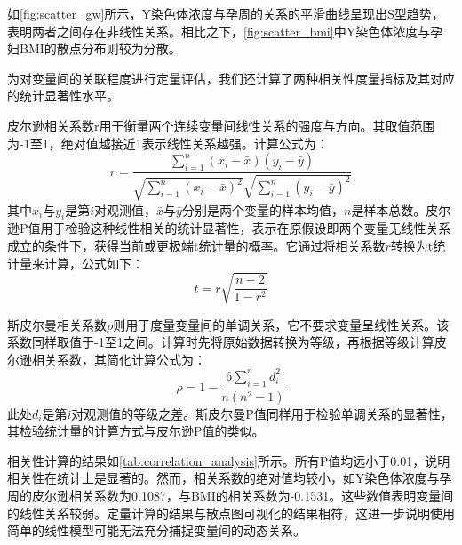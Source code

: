 如\cref{fig:scatter_gw}所示，Y染色体浓度与孕周的关系的平滑曲线呈现出S型趋势，表明两者之间存在非线性关系。相比之下，\cref{fig:scatter_bmi}中Y染色体浓度与孕妇BMI的散点分布则较为分散。

为对变量间的关联程度进行定量评估，我们还计算了两种相关性度量指标及其对应的统计显著性水平。

皮尔逊相关系数r用于衡量两个连续变量间线性关系的强度与方向。其取值范围为-1至1，绝对值越接近1表示线性关系越强。计算公式为：
\begin{equation}
r = \frac{\sum_{i=1}^{n}(x_i - \bar{x})(y_i - \bar{y})}{\sqrt{\sum_{i=1}^{n}(x_i - \bar{x})^2} \sqrt{\sum_{i=1}^{n}(y_i - \bar{y})^2}}
\end{equation}
其中$x_i$与$y_i$是第$i$对观测值，$\bar{x}$与$\bar{y}$分别是两个变量的样本均值，$n$是样本总数。皮尔逊P值用于检验这种线性相关的统计显著性，表示在原假设即两个变量无线性关系成立的条件下，获得当前或更极端t统计量的概率。它通过将相关系数$r$转换为t统计量来计算，公式如下：
\begin{equation}
t = r \sqrt{\frac{n-2}{1-r^2}}
\end{equation}


斯皮尔曼相关系数$\rho$则用于度量变量间的单调关系，它不要求变量呈线性关系。该系数同样取值于-1至1之间。计算时先将原始数据转换为等级，再根据等级计算皮尔逊相关系数，其简化计算公式为：
\begin{equation}
\rho = 1 - \frac{6 \sum_{i=1}^{n} d_i^2}{n(n^2 - 1)}
\end{equation}
此处$d_i$是第$i$对观测值的等级之差。斯皮尔曼P值同样用于检验单调关系的显著性，其检验统计量的计算方式与皮尔逊P值的类似。

\begin{table}[h!]
\centering
\caption{Y染色体浓度与核心自变量的相关性分析}
\label{tab:correlation_analysis}
\end{table}

相关性计算的结果如\cref{tab:correlation_analysis}所示。所有P值均远小于0.01，说明相关性在统计上是显著的。然而，相关系数的绝对值均较小，如Y染色体浓度与孕周的皮尔逊相关系数为0.1087，与BMI的相关系数为-0.1531。这些数值表明变量间的线性关系较弱。定量计算的结果与散点图可视化的结果相符，这进一步说明使用简单的线性模型可能无法充分捕捉变量间的动态关系。


